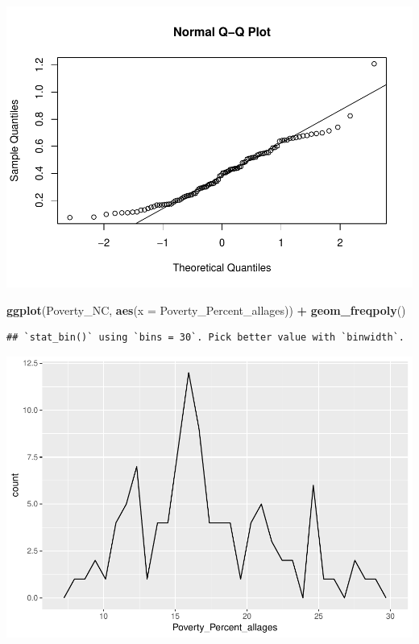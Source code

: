 \documentclass[12pt,]{article}
\newenvironment{Shaded}{\begin{snugshade}}{\end{snugshade}}
\newcommand{\KeywordTok}[1]{\textcolor[rgb]{0.13,0.29,0.53}{\textbf{#1}}}
\newcommand{\DataTypeTok}[1]{\textcolor[rgb]{0.13,0.29,0.53}{#1}}
\newcommand{\StringTok}[1]{\textcolor[rgb]{0.31,0.60,0.02}{#1}}
\newcommand{\OperatorTok}[1]{\textcolor[rgb]{0.81,0.36,0.00}{\textbf{#1}}}
\newcommand{\NormalTok}[1]{#1}
\begin{document}
\includegraphics{Project_Template_files/figure-latex/exploratory graphs-2.pdf}

\begin{Shaded}
\begin{Highlighting}[]
\KeywordTok{ggplot}\NormalTok{(Poverty_NC, }\KeywordTok{aes}\NormalTok{(}\DataTypeTok{x =}\NormalTok{ Poverty_Percent_allages)) }\OperatorTok{+}
\StringTok{  }\KeywordTok{geom_freqpoly}\NormalTok{()}
\end{Highlighting}
\end{Shaded}

\begin{verbatim}
## `stat_bin()` using `bins = 30`. Pick better value with `binwidth`.
\end{verbatim}

\includegraphics{Project_Template_files/figure-latex/exploratory graphs-3.pdf}
\end{document}
